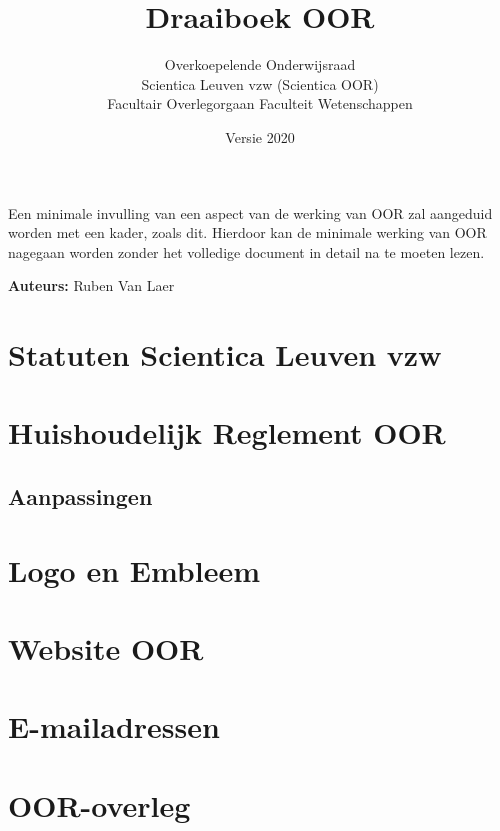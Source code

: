 \documentclass[a4paper,11pt]{article}
\title{Draaiboek OOR}
\author{Overkoepelende Onderwijsraad \\ Scientica Leuven vzw (Scientica OOR) \\ Facultair Overlegorgaan Faculteit Wetenschappen}
\date{Versie 2020}
\begin{document}
	\maketitle
	
	\vspace*{\fill}
	
	\begin{framed}
		Een minimale invulling van een aspect van de werking van OOR zal aangeduid worden met een kader, zoals dit. Hierdoor kan de minimale werking van OOR nagegaan worden zonder het volledige document in detail na te moeten lezen.
	\end{framed}

	\textbf{Auteurs:} Ruben Van Laer
	
	\newpage
	
	\tableofcontents
	
	\newpage
	
	\section{Statuten Scientica Leuven vzw}
	
	\section{Huishoudelijk Reglement OOR}
	
	\subsection{Aanpassingen}
	
	\section{Logo en Embleem}
	
	\section{Website OOR}
	
	\section{E-mailadressen}
	
	\section{OOR-overleg}
	
\end{document}
